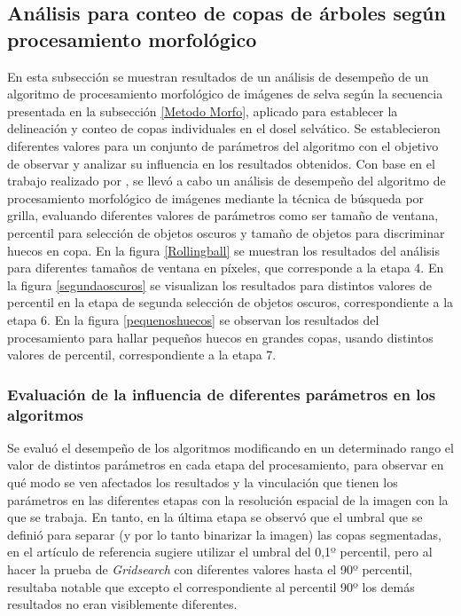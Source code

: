 \subsection{Análisis para conteo de copas de árboles según procesamiento morfológico} \label{resultados morfologico}
En esta subsección se muestran resultados de un análisis de desempeño de un algoritmo de procesamiento morfológico de imágenes de selva según la secuencia presentada en la subsección \ref{Metodo Morfo}, aplicado para establecer la delineación y conteo de copas individuales en el dosel selvático. Se establecieron diferentes valores para un conjunto de parámetros del algoritmo con el objetivo de observar y analizar su influencia en los resultados obtenidos.
Con base en el trabajo realizado por \cite{hubert_wagner_individual_2018}, se llevó a cabo un análisis de desempeño del algoritmo de procesamiento morfológico de imágenes mediante la técnica de búsqueda por grilla, evaluando diferentes valores de parámetros como ser tamaño de ventana, percentil para selección de objetos oscuros y tamaño de objetos para discriminar huecos en copa. En la figura \ref{Rollingball} se muestran los resultados del análisis para diferentes tamaños de ventana en  píxeles, que corresponde a la etapa 4. En la figura \ref{segundaoscuros} se visualizan los resultados para distintos valores de percentil en la etapa de segunda selección de objetos oscuros, correspondiente a la etapa 6. En la figura \ref{pequenoshuecos} se observan los resultados del procesamiento para hallar pequeños huecos en grandes copas, usando distintos valores de percentil, correspondiente a la etapa 7. 



\subsubsection{Evaluación de la influencia de diferentes parámetros en los algoritmos}
Se evaluó el desempeño de los algoritmos modificando en un determinado rango el valor de distintos parámetros en cada etapa del procesamiento, para observar en qué modo se ven afectados los resultados y la vinculación que tienen los parámetros en las diferentes etapas con la resolución espacial de la imagen con la que se trabaja. En tanto, en la última etapa se observó que el umbral
que se definió para separar (y por lo tanto binarizar la imagen) las copas segmentadas, en el artículo de referencia sugiere utilizar el umbral del 0,1º percentil, pero al hacer la prueba de \textit{Gridsearch} con diferentes valores hasta el 90º percentil, resultaba notable que excepto el correspondiente al percentil 90º los demás resultados no eran visiblemente
diferentes.


